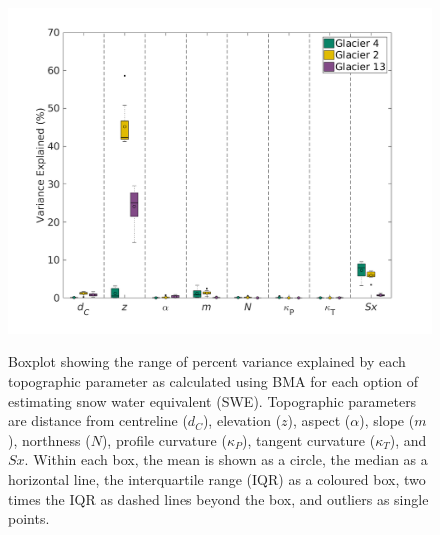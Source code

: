 \documentclass[12pt]{article}
\newcommand{\params}{Topographic parameters are distance from centreline ($d_C$), elevation ($z$), aspect ($\alpha$), slope ($m$), northness ($N$), profile curvature ($\kappa_P$), tangent curvature ($\kappa_T$), and $Sx$. }
\newcommand{\boxplot}{Within each box, the mean is shown as a circle, the median as a horizontal line, the interquartile range (IQR) as a coloured box, two times the IQR as dashed lines beyond the box, and outliers as single points. }
\begin{document}
\begin{figure}[H]
	\centering
	\includegraphics[width = 1.1 \textwidth]{BMSCoeffs_DensityOpts.png}\\
	\caption{Boxplot showing the range of percent variance explained by each topographic parameter as calculated using BMA for each option of estimating snow water equivalent (SWE). \params \boxplot}
	\label{fig:BMSPercentVar_densityOptions}
\end{figure} 
\end{document}
